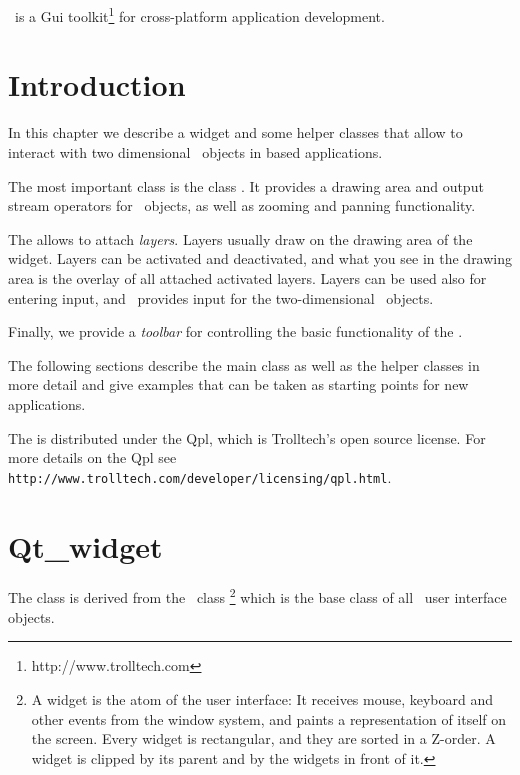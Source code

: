 \cgalqt\ is a {\sc Gui} toolkit\footnote{http://www.trolltech.com} for
cross-platform application development. 

\section{Introduction}

In this chapter we describe a widget and some helper classes that
allow to interact with two dimensional \cgal\ objects in \cgalqt\/ based applications.

The most important class is the class . It provides
a drawing area and output stream operators for \cgal\ objects, as well
as zooming and panning functionality.

The  allows to attach {\em layers}. Layers usually
draw on the drawing area of the widget. Layers can be activated and
deactivated, and what you see in the drawing area is the overlay of
all attached activated layers. Layers can be used also for entering
input, and \cgal\ provides input  for the two-dimensional
\cgal\ objects.

Finally, we provide a {\em toolbar} for controlling the basic functionality
of the .

The following sections describe the main class as well as the helper classes
in more detail and give examples that can be taken as starting points for
new applications.


 The  is distributed under
the {\sc Qpl}, which is Trolltech's open source license. For more details
on the {\sc Qpl} see \verb+http://www.trolltech.com/developer/licensing/qpl.html+.

\section{Qt\_widget}
\label{Qt_widget}

The class  is derived from the \cgalqt\ class %
\footnote{A widget is the atom of the user interface: It receives mouse, keyboard and other 
events from the window system, and paints a representation of itself on the 
screen. Every widget is rectangular, and they are sorted in a Z-order. A 
widget is clipped by its parent and by the widgets in front of it.} 
which is the base class of all \cgalqt\ user interface objects. 


